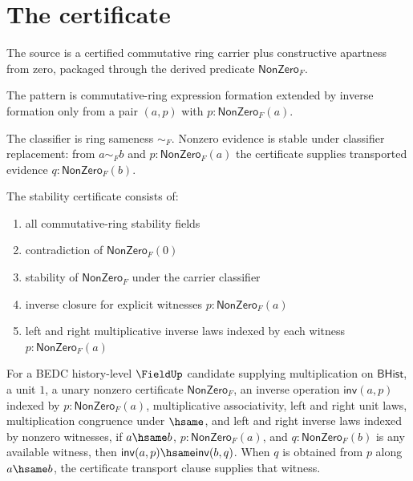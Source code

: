 \section{The certificate}
\begin{definition}
\label{def:field-source-specification}
The source is a certified commutative ring carrier plus constructive apartness from zero, packaged through the derived predicate $\mathsf{NonZero}_F$.
\end{definition}
\begin{definition}
\label{def:field-pattern-specification}
The pattern is commutative-ring expression formation extended by inverse formation only from a pair $(a,p)$ with $p:\mathsf{NonZero}_F(a)$.
\end{definition}
\begin{definition}
\label{def:field-classifier-specification}
The classifier is ring sameness $\sim_F$. Nonzero evidence is stable under classifier replacement: from $a\sim_F b$ and $p:\mathsf{NonZero}_F(a)$ the certificate supplies transported evidence $q:\mathsf{NonZero}_F(b)$.
\end{definition}
\begin{definition}
\label{def:field-stability-certificate}
The stability certificate consists of:
\begin{enumerate}
  \item all commutative-ring stability fields
  \item contradiction of $\mathsf{NonZero}_F(0)$
  \item stability of $\mathsf{NonZero}_F$ under the carrier classifier
  \item inverse closure for explicit witnesses $p:\mathsf{NonZero}_F(a)$
  \item left and right multiplicative inverse laws indexed by each witness $p:\mathsf{NonZero}_F(a)$
\end{enumerate}
\end{definition}
\begin{theorem}
\label{thm:field-inverse-congruence-from-apartness}
For a BEDC history-level $\FieldUp$ candidate supplying multiplication on $\mathsf{BHist}$, a unit $1$, a unary nonzero certificate $\mathsf{NonZero}_F$, an inverse operation $\mathsf{inv}(a,p)$ indexed by $p:\mathsf{NonZero}_F(a)$, multiplicative associativity, left and right unit laws, multiplication congruence under $\hsame$, and left and right inverse laws indexed by nonzero witnesses, if $a\hsame b$, $p:\mathsf{NonZero}_F(a)$, and $q:\mathsf{NonZero}_F(b)$ is any available witness, then $\mathsf{inv}(a,p)\hsame\mathsf{inv}(b,q)$. When $q$ is obtained from $p$ along $a\hsame b$, the certificate transport clause supplies that witness.
\end{theorem}
